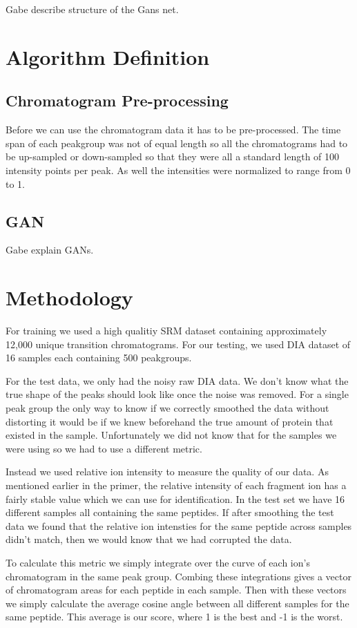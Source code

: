 \documentclass[12pt]{article}
\begin{document}
\color{red}
Gabe describe structure of the Gans net. 
\color{black}
\section{Algorithm Definition}
\subsection{Chromatogram Pre-processing}
Before we can use the chromatogram data it has to be pre-processed. The time span of each peakgroup was not of equal length so all the chromatograms had to be up-sampled or down-sampled so that they were all a standard length of 100 intensity points per peak. As well the intensities were normalized to range from 0 to 1.   
\subsection{GAN}
\color{red}
Gabe explain GANs.
\color{black}
\section{Methodology}
For training we used a high qualitiy SRM dataset\cite{Smooth_data} containing approximately 12,000 unique transition chromatograms. For our testing, we used DIA dataset \cite{TRIC} of 16 samples each containing 500 peakgroups.

For the test data, we only had the noisy raw DIA data. We don't know what the true shape of the peaks should look like once the noise was removed. For a single peak group the only way to know if we correctly smoothed the data without distorting it would be if we knew beforehand the true amount of protein that existed in the sample. Unfortunately we did not know that for the samples we were using so we had to use a different metric. 

Instead we used relative ion intensity to measure the quality of our data. As mentioned earlier in the primer, the relative intensity of each fragment ion has a fairly stable value which we can use for identification. In the test set we have 16 different samples all containing the same peptides. If after smoothing the test data we found that the relative ion intensties for the same peptide across samples didn't match, then we would know that we had corrupted the data. 

To calculate this metric we simply integrate over the curve of each ion's chromatogram in the same peak group. Combing these integrations gives a vector of chromatogram areas for each peptide in each sample. Then with these vectors we simply calculate the average cosine angle between all different samples for the same peptide. This average is our score, where 1 is the best and -1 is the worst.
\end{document}
